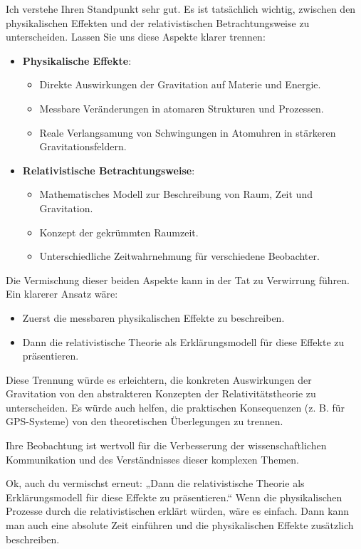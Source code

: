 \documentclass[a4paper,12pt]{article}
\begin{document}
	Ich verstehe Ihren Standpunkt sehr gut. Es ist tatsächlich wichtig, zwischen den physikalischen Effekten und der relativistischen Betrachtungsweise zu unterscheiden. Lassen Sie uns diese Aspekte klarer trennen:
	\begin{itemize}
		\item \textbf{Physikalische Effekte}:
		\begin{itemize}
			\item Direkte Auswirkungen der Gravitation auf Materie und Energie.
			\item Messbare Veränderungen in atomaren Strukturen und Prozessen.
			\item Reale Verlangsamung von Schwingungen in Atomuhren in stärkeren Gravitationsfeldern.
		\end{itemize}
		\item \textbf{Relativistische Betrachtungsweise}:
		\begin{itemize}
			\item Mathematisches Modell zur Beschreibung von Raum, Zeit und Gravitation.
			\item Konzept der gekrümmten Raumzeit.
			\item Unterschiedliche Zeitwahrnehmung für verschiedene Beobachter.
		\end{itemize}
	\end{itemize}
	
	Die Vermischung dieser beiden Aspekte kann in der Tat zu Verwirrung führen. Ein klarerer Ansatz wäre:
	\begin{itemize}
		\item Zuerst die messbaren physikalischen Effekte zu beschreiben.
		\item Dann die relativistische Theorie als Erklärungsmodell für diese Effekte zu präsentieren.
	\end{itemize}
	
	Diese Trennung würde es erleichtern, die konkreten Auswirkungen der Gravitation von den abstrakteren Konzepten der Relativitätstheorie zu unterscheiden. Es würde auch helfen, die praktischen Konsequenzen (z. B. für GPS-Systeme) von den theoretischen Überlegungen zu trennen.
	
	Ihre Beobachtung ist wertvoll für die Verbesserung der wissenschaftlichen Kommunikation und des Verständnisses dieser komplexen Themen.
	
	Ok, auch du vermischst erneut: „Dann die relativistische Theorie als Erklärungsmodell für diese Effekte zu präsentieren.“ Wenn die physikalischen Prozesse durch die relativistischen erklärt würden, wäre es einfach. Dann kann man auch eine absolute Zeit einführen und die physikalischen Effekte zusätzlich beschreiben.
	
\end{document}
